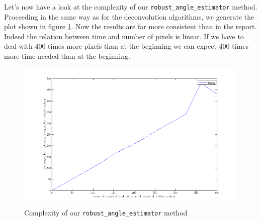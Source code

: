 \documentclass{article}
\begin{document}
Let's now have a look at the complexity of our \texttt{robust\_angle\_estimator} method. Proceeding in the same way as for the deconvolution algorithms, we generate the plot shown in figure \ref{fig:ComplexityRadon}. Now the results are far more consistent than in the report. Indeed the relation between time and number of pixels is linear. If we have to deal with 400 times more pixels than at the beginning we can expect 400 times more time needed than at the beginning. 


\begin{figure}[h!]
\centering
\includegraphics[scale=0.4]{../Images/ComplexityRadon.png}
\caption{Complexity of our \texttt{robust\_angle\_estimator} method}
\label{fig:ComplexityRadon}
\end{figure}
\end{document}
